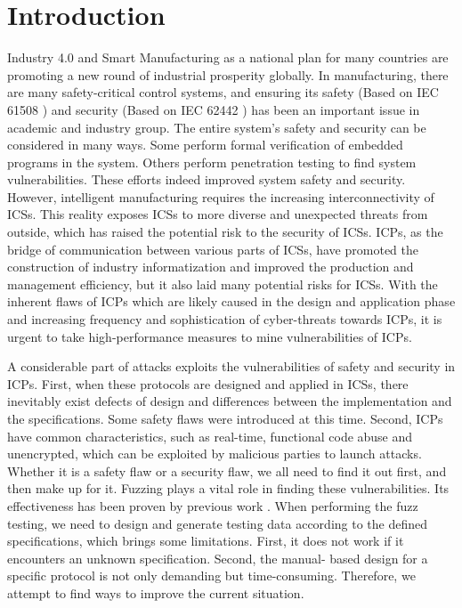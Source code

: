 \section{Introduction}
Industry 4.0 and Smart Manufacturing as a national plan for many countries are promoting a new round of industrial prosperity globally. In manufacturing, there are many safety-critical control systems, and ensuring its safety (Based on IEC  61508 \cite{bell2006introduction}) and security (Based on IEC 62442 \cite{piggin2013development}) has been an important issue in academic and industry group. The entire system’s safety and security can be considered in many ways. Some perform formal verification \cite{braibant2011coquet} of embedded programs in the system. Others perform penetration testing \cite{mcdermott2001attack} to find system vulnerabilities. These efforts indeed improved system safety and security. However, intelligent manufacturing requires the increasing interconnectivity of ICSs. This reality exposes ICSs to more diverse and unexpected threats from outside, which has raised the potential risk to the security of ICSs.  ICPs, as the bridge of communication between various parts of ICSs, have promoted the construction of industry informatization and improved the production and management efficiency, but it also laid many potential risks for ICSs. With the inherent flaws of ICPs which are likely caused in the design and application phase and increasing frequency and sophistication of cyber-threats towards ICPs, it is urgent to take high-performance measures to mine vulnerabilities of ICPs.

A considerable part of attacks exploits the vulnerabilities of safety and security in ICPs. First, when these protocols are designed and applied in ICSs, there inevitably exist defects of design and differences between the implementation and the specifications. Some safety flaws were introduced at this time. Second, ICPs have common characteristics, such as real-time, functional code abuse and unencrypted, which can be exploited by malicious parties to launch attacks. Whether it is a safety flaw or a security flaw, we all need to find it out first, and then make up for it. Fuzzing \cite{miller1990empirical, miller1995fuzz} plays a vital role in finding these vulnerabilities. Its effectiveness has been proven by previous work \cite{wang2013design, voyiatzis2015modbus}. When performing the fuzz testing, we need to design and generate testing data according to the defined specifications, which brings some limitations. First, it does not work if it encounters an unknown specification. Second, the manual- based design for a specific protocol is not only demanding but time-consuming. Therefore, we attempt to find ways to improve the current situation. 

